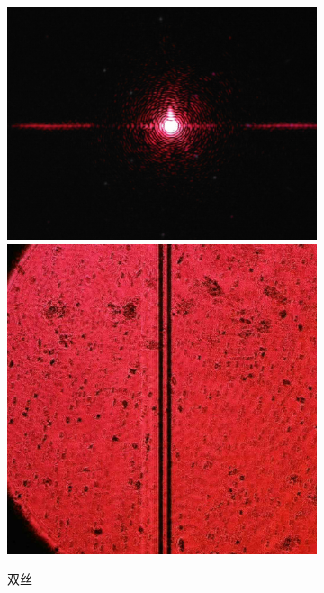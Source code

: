 \documentclass[a4paper]{article}
\begin{document}
\begin{figure}[htbp]
    \begin{subfigure}[htbp]{0.3\textwidth}
        \centering
        \includegraphics[width=\textwidth]{fre-done/3-5.JPG}
        \includegraphics[width=\textwidth]{img-done/3-5.JPG}
        \caption{双丝}
        \label{3-5}
    \end{subfigure}
    \begin{subfigure}[htbp]{0.3\textwidth}

\end{subfigure}
\end{figure}
\end{document}
